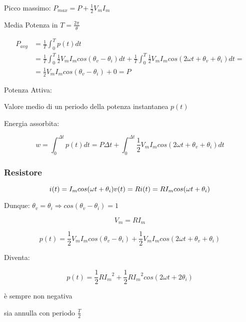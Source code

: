 \documentclass[12pt,titlepage,a4paper]{book}
\begin{document}
Picco massimo: $ P_{max} = P + \frac{1}{2} V_m I_m $

Media Potenza in $ T = \frac{2 \pi}{\theta} $

\begin{equation*}
  \begin{split}
    P_{avg} & = \frac{1}{T} \int_{0}^{T} p(t) dt \\
    & = \frac{1}{T} \int_{0}^{T} \frac{1}{2} V_m I_m cos(\theta_v - \theta_i) dt +
    \frac{1}{T} \int_{0}^{T} \frac{1}{2}V_mI_mcos(2 \omega t + \theta_v + \theta_i) dt = \\
    & = \frac{1}{2} V_m I_m cos(\theta_v - \theta_i) + 0 = P
  \end{split}
\end{equation*}

Potenza Attiva:

Valore medio di un periodo della potenza instantanea $p(t)$

Energia assorbita:

\begin{equation*}
  w = \int_{0}^{\Delta t} p(t) dt = P \Delta t + \int_{0}^{\Delta t} \frac{1}{2} V_m I_m cos(2 \omega t + \theta_v + \theta_i) dt
\end{equation*}

\subsubsection{Resistore}

\begin{equation*}
  i(t) = I_m cos(\omega t + \theta_i) \\
  v(t) = Ri(t) = R I_m cos(\omega t + \theta_i)
\end{equation*}

Dunque: $\theta_v = \theta_i \Rightarrow cos(\theta_v - \theta_i) = 1$

$$ V_m = R I_m $$

\begin{equation*}
  p(t) = \frac{1}{2}V_mI_mcos(\theta_v - \theta_i) + \frac{1}{2}V_mI_mcos(2 \omega t + \theta_v + \theta_i)
\end{equation*}

Diventa:

\begin{equation*}
  p(t) = \frac{1}{2} R {I_m}^2 + \frac{1}{2} R {I_m}^2 cos(2 \omega t + 2 \theta_i)
\end{equation*}

\begin{list}{-}{La potenza istantanea}
  \item è sempre non negativa
  \item sia annulla con periodo $ \frac{T}{2}$
\end{list}
\end{document}
